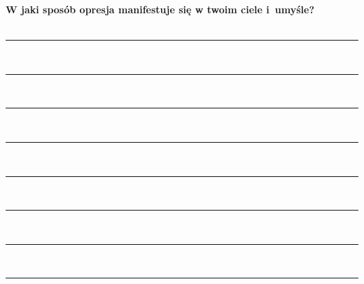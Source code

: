 \newpage
\noindent
\textcolor{ProcessBlue}{\textbf{\Large{W jaki sposób opresja manifestuje się w twoim ciele i~umyśle?}}}\\\\
\noindent\rule{\textwidth}{1pt}\\
\noindent\rule{\textwidth}{1pt}\\
\noindent\rule{\textwidth}{1pt}\\
\noindent\rule{\textwidth}{1pt}\\
\noindent\rule{\textwidth}{1pt}\\
\noindent\rule{\textwidth}{1pt}\\
\noindent\rule{\textwidth}{1pt}\\
\noindent\rule{\textwidth}{1pt}\\\\

